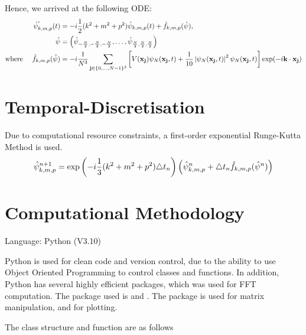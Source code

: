 \documentclass[a4paper,8pt]{article}
\begin{document}
Hence, we arrived at the following ODE:
\begin{align}
\hat{\psi}^{'}_{k,m,p} (t) &= -i \frac{1}{2}(k^2 + m^2 + p^2) \hat{\psi}_{k,m,p} (t) + \hat{f}_{k,m,p} (\hat{\bold{\psi}}), \nonumber \\
\hat{\bold{\psi}} &= \left(\hat{\bold{\psi}}_{-\frac{N}{2}, -\frac{N}{2}, -\frac{N}{2}}, \ldots,  \hat{\bold{\psi}}_{\frac{N}{2}, \frac{N}{2}, \frac{N}{2}} \right) \nonumber \\
\text{where \ \ \ } \hat{f}_{k,m,p} (\hat{\bold{\psi}}) &= -i \frac{1}{N^3} \sum\limits_{\bold{j} \in \{0, \ldots, N-1\}^3} \left[V(\bold{x}_{\bold{j}}) \psi_N(\bold{x}_{\bold{j}}, t) + \frac{1}{10} \left\lvert\psi_N(\bold{x}_{\bold{j}}, t)\right\rvert^2 \psi_N(\bold{x}_{\bold{j}}, t) \right] \text{exp} (-i \bold{k} \cdot \bold{x}_{\bold{j}}) \nonumber
\end{align}

\section{Temporal-Discretisation}

Due to computational resource constraints, a first-order exponential Runge-Kutta Method is used.
\begin{equation}
\hat{\psi}^{n+1}_{k,m,p} = \text{exp}\left(-i\frac{1}{3}(k^2 + m^2 + p^2) \triangle t_n \right) \left(\hat{\psi}^{n}_{k,m,p} + \triangle t_n \hat{f}_{k,m,p} (\hat{\bold{\psi}}^n)\right) \nonumber
\end{equation}

\section{Computational Methodology}

Language: Python (V3.10) \newline

Python is used for clean code and version control, due to the ability to use Object Oriented Programming to control classes and functions. In addition, Python has several highly efficient packages, which was used for FFT computation. The package used is  and . The package  is used for matrix manipulation, and  for plotting. \newline

The class structure and function are as follows \newline
\end{document}
